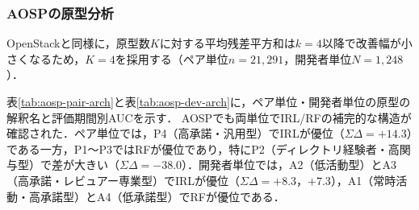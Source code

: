 \documentclass[submit,noauthor,ses,dvipdfmx]{ipsj}
\newcommand{\todo}[1]{\colorbox{yellow}{{\bf TODO}:}{\color{red} {\textbf{[#1]}}}}
\begin{document}







\subsubsection{AOSPの原型分析}\label{sec:aosp-arch}
OpenStackと同様に，原型数$K$に対する平均残差平方和は$k=4$以降で改善幅が小さくなるため，$K=4$を採用する（ペア単位$n=21{,}291$，開発者単位$N=1{,}248$）．

表\ref{tab:aosp-pair-arch}と表\ref{tab:aosp-dev-arch}に，ペア単位・開発者単位の原型の解釈名と評価期間別AUCを示す． AOSPでも両単位でIRL/RFの補完的な構造が確認された．ペア単位では，P4（高承諾・汎用型）でIRLが優位（$\Sigma\Delta=+14.3$）である一方，P1〜P3ではRFが優位であり，特にP2（ディレクトリ経験者・高関与型）で差が大きい（$\Sigma\Delta=-38.0$）．開発者単位では，A2（低活動型）とA3（高承諾・レビュアー専業型）でIRLが優位（$\Sigma\Delta=+8.3$，$+7.3$），A1（常時活動・高承諾型）とA4（低承諾型）でRFが優位である．
\end{document}
